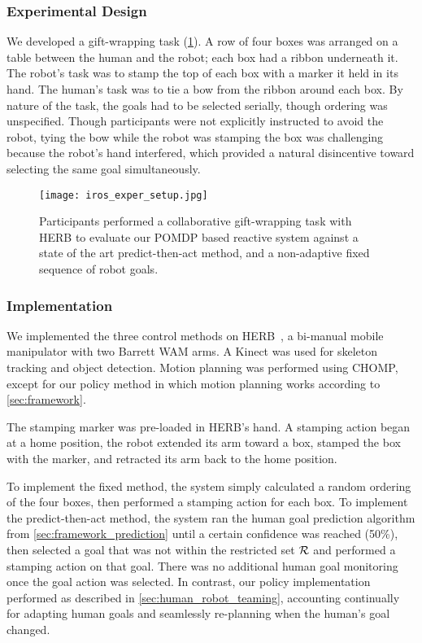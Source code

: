 \subsubsection{Experimental Design}
We developed a gift-wrapping task (\cref{fig:collab_exper_setup}). A row of four boxes was arranged on a table between the human and the robot; each box had a ribbon underneath it. The robot's task was to stamp the top of each box with a marker it held in its hand. The human's task was to tie a bow from the ribbon around each box. By nature of the task, the goals had to be selected serially, though ordering was unspecified. Though participants were not explicitly instructed to avoid the robot, tying the bow while the robot was stamping the box was challenging because the robot's hand interfered, which provided a natural disincentive toward selecting the same goal simultaneously.
%
\begin{figure}
	\centering
	\texttt{[image: iros\_exper\_setup.jpg]}
  \caption{Participants performed a collaborative gift-wrapping task with HERB to evaluate our POMDP based reactive system against a state of the art predict-then-act method, and a non-adaptive fixed sequence of robot goals.}
	\label{fig:collab_exper_setup}
\end{figure}
%


\subsubsection{Implementation}
We implemented the three control methods on HERB~\citet{srinivasa_2012}, a bi-manual mobile manipulator with two Barrett WAM arms. A Kinect was used for skeleton tracking and object detection. Motion planning was performed using CHOMP, except for our policy method in which motion planning works according to \cref{sec:framework}.

The stamping marker was pre-loaded in HERB's hand. A stamping action began at a home position, the robot extended its arm toward a box, stamped the box with the marker, and retracted its arm back to the home position.

To implement the fixed method, the system simply calculated a random ordering of the four boxes, then performed a stamping action for each box. To implement the predict-then-act method, the system ran the human goal prediction algorithm from \cref{sec:framework_prediction} until a certain confidence was reached (50\%), then selected a goal that was not within the restricted set $\mathcal{R}$ and performed a stamping action on that goal. There was no additional human goal monitoring once the goal action was selected. In contrast, our policy implementation performed as described in \cref{sec:human_robot_teaming}, accounting continually for adapting human goals and seamlessly re-planning when the human's goal changed.


